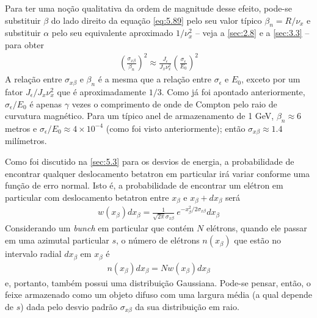 Para ter uma noção qualitativa da ordem de magnitude desse efeito, pode-se substituir $\beta$ do lado direito da equação \eqref{eq:5.89} pelo seu valor típico $\beta_n = R/\nu_x$ e substituir $\alpha$ pelo seu equivalente aproximado $1/\nu_x^2$ -- veja a \autoref{sec:2.8} e a \autoref{sec:3.3} -- para obter
\begin{align}
	\left(\frac{\sigma_{x\beta}}{\beta_n}\right)^2 \approx \frac{J_\epsilon}{J_x \nu_x^2}\left(\frac{\sigma_\epsilon}{E_0}\right)^2
\end{align}
A relação entre $\sigma_{x\beta}$ e $\beta_n$ é a mesma que a relação entre $\sigma_\epsilon$ e $E_0$, exceto por um fator $J_\epsilon/J_x \nu_x^2$ que é aproximadamente $1/3$. Como já foi apontado anteriormente, $\sigma_\epsilon/E_0$ é apenas $\gamma$ vezes o comprimento de onde de Compton pelo raio de curvatura magnético. Para um típico anel de armazenamento de 1 GeV, $\beta_n \approx 6$ metros e $\sigma_\epsilon/E_0 \approx 4 \times 10^{-4}$ (como foi visto anteriormente); então $\sigma_{x\beta} \approx 1.4$ milímetros. 

Como foi discutido na \autoref{sec:5.3} para os desvios de energia, a probabilidade de encontrar qualquer deslocamento betatron em particular irá variar conforme uma função de erro normal. Isto é, a probabilidade de encontrar um elétron em particular com deslocamento betatron entre $x_\beta$ e $x_\beta + dx_\beta$ será
\begin{align}
	w(x_\beta)dx_\beta = \frac{1}{\sqrt{2\pi} \sigma_{x\beta}}\ e^{-x_\beta^2/2\sigma_{x\beta}}dx_\beta
\end{align}
Considerando um \textit{bunch} em particular que contém $N$ elétrons, quando ele passar em uma azimutal particular $s$, o número de elétrons $n(x_\beta)$ que estão no intervalo radial $dx_\beta$ em $x_\beta$ é
\begin{align*}
	n(x_\beta)dx_\beta = Nw(x_\beta)dx_\beta
\end{align*}
e, portanto, também possui uma distribuição Gaussiana. Pode-se pensar, então, o feixe armazenado como um objeto difuso com uma largura média (a qual depende de $s$) dada pelo desvio padrão $\sigma_{x\beta}$ da sua distribuição em raio.

